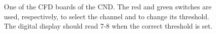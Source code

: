\documentclass[12pt]{article}
\begin{document}
\begin{figure}
\begin{center}
\caption {One of the CFD boards of the CND. The red and green switches are used, respectively, to select the channel and to change its threshold. The digital display should read 7-8 when the correct threshold is set.}
\label{cfd_figure}
\end{center}
\end{figure}
\end{document}
